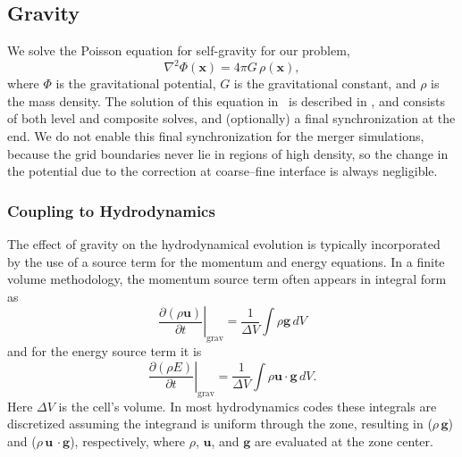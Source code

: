 \documentclass[12pt]{article}
\begin{document}
\subsection{Gravity}
\label{sec:gravity}

We solve the Poisson equation for self-gravity for our problem,
\begin{equation}
  \nabla^2 \Phi(\mathbf{x}) = 4\pi G\, \rho(\mathbf{x}),
\end{equation}
where $\Phi$ is the gravitational potential,
$G$ is the gravitational constant, and $\rho$ is the mass density.
The solution of this equation in \castro\ is described in \cite{castro}, and
consists of both level and composite solves, and (optionally) a final
synchronization at the end. We do not enable this final synchronization
for the merger simulations, because the grid boundaries never lie in
regions of high density, so the change in the potential due to the correction
at coarse--fine interface is always negligible.

\subsubsection{Coupling to Hydrodynamics}\label{sec:gravity_hydro_coupling}

The effect of gravity on the hydrodynamical evolution is typically
incorporated by the use of a source term for the momentum and energy
equations. In a finite volume methodology, the momentum source term
often appears in integral form as
\begin{equation}
  \left.\frac{\partial (\rho \mathbf{u})}{\partial t}\right|_{\text{grav}} = \frac{1}{\Delta V} \int \rho \mathbf{g}\, dV
\end{equation}
and for the energy source term it is
\begin{equation}
  \left.\frac{\partial (\rho E)}{\partial t}\right|_{\text{grav}} = \frac{1}{\Delta V} \int \rho \mathbf{u}\cdot\mathbf{g}\, dV \label{eq:cell_center_gravity_source}.
\end{equation}
Here $\Delta V$ is the cell's volume.
In most hydrodynamics codes these integrals are discretized assuming the
integrand is uniform through the zone, resulting in ($\rho\,
\mathbf{g}$) and ($\rho\, \mathbf{u}\,\cdot\mathbf{g}$), respectively,
where $\rho$, $\mathbf{u}$, and $\mathbf{g}$
are evaluated at the zone center.
\end{document}
